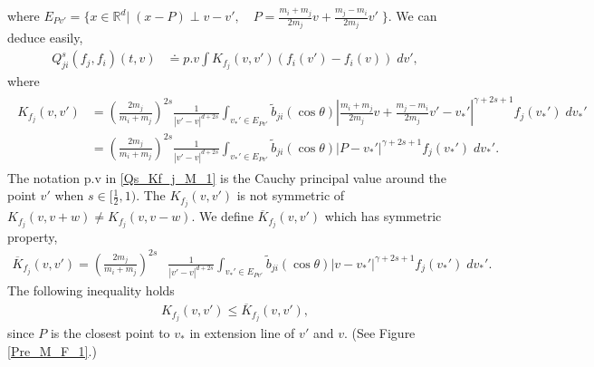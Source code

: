 \documentclass[reqno,10pt]{amsart}
\numberwithin{equation}{section}
\begin{document}
where $ E_{Pv'} = \{x \in \mathbb{R}^d|\; (x-P)\;\bot \;v-v' , \quad P=\frac{m_i+m_j}{2m_j}v+\frac{m_j-m_i}{2m_j}v'\; \}.$ We can deduce easily, 
\begin{align} \label{Qs_Kf_j_M_1} 
Q^{s}_{ji}(f_j,f_i)(t,v) &\doteq p.v \int K_{f_j}(v,v')(f_i(v')-f_i(v)) \;dv',
\end{align}
where 
\begin{align}  \label{Kf_j_M_1} 
\begin{split}
    K_{f_j}(v,v') &= (\frac{2m_j}{m_i+m_j})^{2s}\frac{1}{|v'-v|^{d+2s}}\int_{v_*'\in E_{Pv'}} \tilde{b}_{ji}(\cos\theta) |\frac{m_i+m_j}{2m_j}v+\frac{m_j-m_i}{2m_j}v'-v_*'|^{\gamma+2s+1}f_j(v_*')\; dv_*'\\
    &= (\frac{2m_j}{m_i+m_j})^{2s}\frac{1}{|v'-v|^{d+2s}}\int_{v_*'\in E_{Pv'}} \tilde{b}_{ji}(\cos\theta) |P-v_*'|^{\gamma+2s+1}f_j(v_*')\; dv_*'. 
\end{split}
\end{align} The notation p.v in \eqref{Qs_Kf_j_M_1} is the Cauchy principal value around the point $v'$ when $s\in[\frac{1}{2},1).$
The $K_{f_j}(v,v')$ is not symmetric of $K_{f_j}(v,v+w)\neq K_{f_j}(v,v-w)$. We define $\overline{K}_{f_j}(v,v')$ which has symmetric property,
\begin{align} \label{K'f_j_M_1}
    \overline{K}_{f_j}(v,v') = (\frac{2m_j}{m_i+m_j})^{2s}&\frac{1}{|v'-v|^{d+2s}}\int_{v_*'\in E_{Pv'}} \tilde{b}_{ji}(\cos\theta) |v-v_*'|^{\gamma+2s+1}f_j(v_*')\; dv_*'.
\end{align} The following inequality holds
\begin{align} \label{K_M_1_inequ}
    K_{f_j}(v,v') \leq \overline{K}_{f_j}(v,v'),
\end{align} since $P$ is the closest point to $v_*$ in extension line of $v'$ and $v$. (See Figure \ref{Pre_M_F_1}.) \vspace{3mm}
\end{document}
